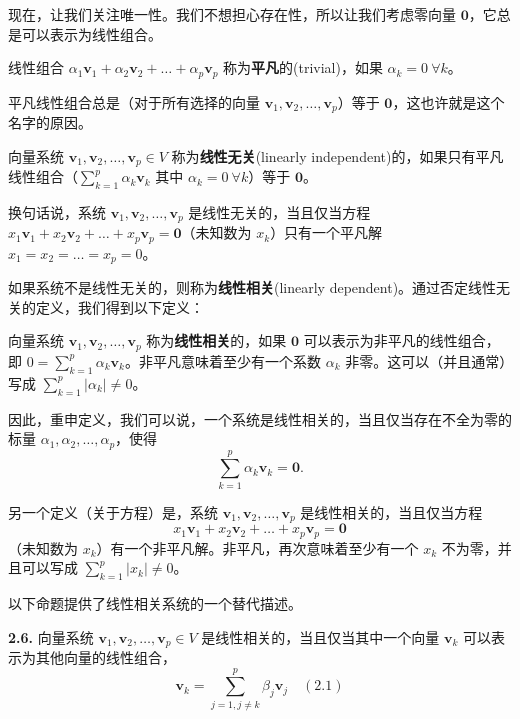 现在，让我们关注唯一性。我们不想担心存在性，所以让我们考虑零向量 $\mathbf{0}$，它总是可以表示为线性组合。

\begin{definition} 线性组合 $\alpha_1 \mathbf{v}_1 + \alpha_2 \mathbf{v}_2 + \dots + \alpha_p \mathbf{v}_p$ 称为\textbf{平凡}的(trivial)，如果 $\alpha_k = 0 \ \forall k$。
\end{definition}

平凡线性组合总是（对于所有选择的向量 $\mathbf{v}_1, \mathbf{v}_2, \dots, \mathbf{v}_p$）等于 $\mathbf{0}$，这也许就是这个名字的原因。


\begin{definition}向量系统 $\mathbf{v}_1, \mathbf{v}_2, \dots, \mathbf{v}_p \in V$ 称为\textbf{线性无关}(linearly independent)的，如果只有平凡线性组合（$\sum_{k=1}^p \alpha_k \mathbf{v}_k$ 其中 $\alpha_k = 0 \ \forall k$）等于 $\mathbf{0}$。

换句话说，系统 $\mathbf{v}_1, \mathbf{v}_2, \dots, \mathbf{v}_p$ 是线性无关的，当且仅当方程 $x_1 \mathbf{v}_1 + x_2 \mathbf{v}_2 + \dots + x_p \mathbf{v}_p = \mathbf{0}$（未知数为 $x_k$）只有一个平凡解 $x_1 = x_2 = \dots = x_p = 0$。
\end{definition}

如果系统不是线性无关的，则称为\textbf{线性相关}(linearly dependent)。通过否定线性无关的定义，我们得到以下定义：



\begin{definition}向量系统 $\mathbf{v}_1, \mathbf{v}_2, \dots, \mathbf{v}_p$ 称为\textbf{线性相关}的，如果 $\mathbf{0}$ 可以表示为非平凡的线性组合，即 $0 = \sum_{k=1}^p \alpha_k \mathbf{v}_k$。非平凡意味着至少有一个系数 $\alpha_k$ 非零。这可以（并且通常）写成 $\sum_{k=1}^p |\alpha_k| \neq 0$。
\end{definition}

因此，重申定义，我们可以说，一个系统是线性相关的，当且仅当存在不全为零的标量 $\alpha_1, \alpha_2, \dots, \alpha_p$，使得 
$$\sum_{k=1}^p \alpha_k \mathbf{v}_k = \mathbf{0}.$$

另一个定义（关于方程）是，系统 $\mathbf{v}_1, \mathbf{v}_2, \dots, \mathbf{v}_p$ 是线性相关的，当且仅当方程 
$$x_1 \mathbf{v}_1 + x_2 \mathbf{v}_2 + \dots + x_p \mathbf{v}_p = \mathbf{0}$$
（未知数为 $x_k$）有一个非平凡解。非平凡，再次意味着至少有一个 $x_k$ 不为零，并且可以写成 $\sum_{k=1}^p |x_k| \neq 0$。

以下命题提供了线性相关系统的一个替代描述。

\begin{proposition}
\textbf{2.6.} 向量系统 $\mathbf{v}_1, \mathbf{v}_2, \dots, \mathbf{v}_p \in V$ 是线性相关的，当且仅当其中一个向量 $\mathbf{v}_k$ 可以表示为其他向量的线性组合，
\begin{equation}\nonumber
\mathbf{v}_k = \sum_{j=1, j \neq k}^p \beta_j \mathbf{v}_j \quad (2.1)
\end{equation}
\end{proposition}


